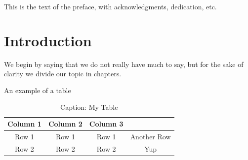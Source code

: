 \documentclass[phd]{pittetd}
\begin{document}
\begin{abstract}
The abstract of the document.
This document is a sample file for the creation of ETD's at Pitt through \LaTeX.
\end{abstract}




\tableofcontents

\listoftables

\listoffigures




\preface

This is the text of the preface, with acknowledgments, dedication, etc.



\chapter{Introduction}%
We begin by saying that we do not really have much to say, but for the sake of clarity we divide our topic in chapters.

An example of a table
\begin{table}[h]
\centering
\caption{Caption: My Table}
\label{Reference: Title of my Table}
\begin{tabular}{|c|c|c|c|}
\hline
Column 1 & Column 2 & Column 3 &\\ \hline
Row 1 & Row 1 & Row 1 & Another Row\\ \hline
Row 2 & Row 2 & Row 2 & Yup\\ \hline
\end{tabular}
\end{table}
\end{document}
